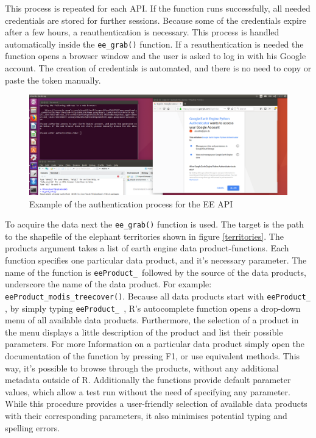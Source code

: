 This process is repeated for each API. If the function runs successfully, all needed credentials are stored for further sessions. Because some of the credentials expire after a few hours, a reauthentication is necessary. This process is handled automatically inside the \texttt{ee\_grab()} function. If a reauthentication is needed the function opens a browser window and the user is asked to log in with his Google account. The creation of credentials is automated, and there is no need to copy or paste the token manually.

\begin{center}
	\begin{figure}[h]
		\begin{center}
			\includegraphics[width=15cm]{images/install_authentication.png}
			\caption{Example of the authentication process for the EE API}
			\label{install}
		\end{center}
	\end{figure}
\end{center}



To acquire the data next the \texttt{ee\_grab()} function is used. The target is the path to the shapefile of the elephant territories shown in figure \ref{territories}. The products argument takes a list of earth engine data product-functions. Each function specifies one particular data product, and it's necessary parameter. The name of the function is \texttt{eeProduct\_ }followed by the source of the data products, underscore the name of the data product. For example: \texttt{eeProduct\_modis\_treecover()}. Because all data products start with \texttt{eeProduct\_ }, by simply typing \texttt{eeProduct\_ }, R's autocomplete function opens a drop-down menu of all available data products. Furthermore, the selection of a product in the menu displays a little description of the product and list their possible parameters. For more Information on a particular data product simply open the documentation of the function by pressing F1, or use equivalent methods. This way, it's possible to browse through the products, without any additional metadata outside of R. Additionally the functions provide default parameter values, which allow a test run without the need of specifying any parameter. While this procedure provides a user-friendly selection of available data products with their corresponding parameters, it also minimises potential typing and spelling errors.

